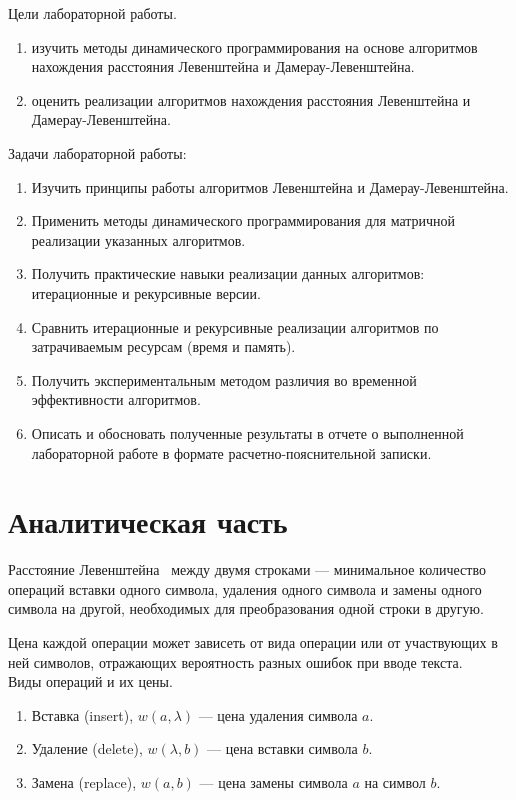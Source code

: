 \documentclass[12pt]{report}
\begin{document}
    Цели лабораторной работы.
    \begin{enumerate}
        \item изучить методы динамического программирования на основе алгоритмов нахождения расстояния
        Левенштейна и Дамерау-Левенштейна.
        \item оценить реализации алгоритмов нахождения расстояния Левенштейна и Дамерау-Левенштейна.
    \end{enumerate}

    Задачи лабораторной работы:
    \begin{enumerate}
        \item Изучить принципы работы алгоритмов Левенштейна и Дамерау-Левенштейна.
        \item Применить методы динамического программирования для матричной реализации указанных алгоритмов.
        \item Получить практические навыки реализации данных алгоритмов: итерационные и рекурсивные версии.
        \item Сравнить итерационные и рекурсивные реализации алгоритмов по затрачиваемым ресурсам (время и память).
        \item Получить экспериментальным методом различия во временной эффективности алгоритмов.
        \item Описать и обосновать полученные результаты в отчете о выполненной лабораторной работе
        в формате расчетно-пояснительной записки.
    \end{enumerate}

    \newpage


    \chapter{Аналитическая часть}

    Расстояние Левенштейна~\cite{levenshtein} между двумя строками ---
    минимальное количество операций вставки одного символа, удаления одного символа
    и замены одного символа на другой, необходимых для преобразования одной строки в другую.

    Цена каждой операции может зависеть от вида операции или от участвующих в ней символов, отражающих вероятность
    разных ошибок при вводе текста.
    \\
    Виды операций и их цены.
    \begin{enumerate}
        \item Вставка (insert), $w(a,\lambda)$ --- цена удаления символа $a$.
        \item Удаление (delete), $w(\lambda, b)$ --- цена вставки символа $b$.
        \item Замена (replace), $w(a, b)$ --- цена замены символа $a$ на символ $b$.
    \end{enumerate}
\end{document}
